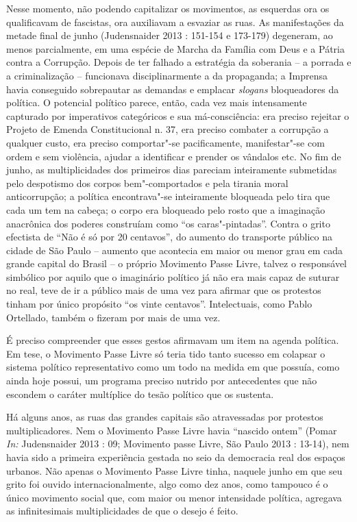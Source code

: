Nesse momento, não podendo capitalizar os movimentos, as esquerdas ora
os qualificavam de fascistas, ora auxiliavam a esvaziar as ruas. As
manifestações da metade final de junho (Judensnaider 2013 : 151-154 e
173-179) degeneram, ao menos parcialmente, em uma espécie de Marcha da
Família com Deus e a Pátria contra a Corrupção. Depois de ter falhado a
estratégia da soberania -- a porrada e a criminalização -- funcionava
disciplinarmente a da propaganda; a Imprensa havia conseguido
sobrepautar as demandas e emplacar \emph{slogans }bloqueadores da
política. O potencial político parece, então, cada vez mais intensamente
capturado por imperativos categóricos e sua má-consciência: era preciso
rejeitar o Projeto de Emenda Constitucional n. 37, era preciso combater
a corrupção a qualquer custo, era preciso comportar"-se pacificamente,
manifestar"-se com ordem e sem violência, ajudar a identificar e prender
os vândalos etc. No fim de junho, as multiplicidades dos primeiros dias
pareciam inteiramente submetidas pelo despotismo dos corpos
bem"-comportados e pela tirania moral anticorrupção; a política
encontrava"-se inteiramente bloqueada pelo tira que cada um tem na
cabeça; o corpo era bloqueado pelo rosto que a imaginação anacrônica dos
poderes construíam como ``os caras"-pintadas''. Contra o grito efectista
de ``Não é só por 20 centavos'', do aumento do transporte público na
cidade de São Paulo -- aumento que acontecia em maior ou menor grau em
cada grande capital do Brasil -- o próprio Movimento Passe Livre, talvez
o responsável simbólico por aquilo que o imaginário político já não era
mais capaz de suturar no real, teve de ir a público mais de uma vez para
afirmar que os protestos tinham por único propósito ``os vinte
centavos''. Intelectuais, como Pablo Ortellado, também o fizeram por
mais de uma vez.

É preciso compreender que esses gestos afirmavam um item na agenda
política. Em tese, o Movimento Passe Livre só teria tido tanto sucesso
em colapsar o sistema político representativo como um todo na medida em
que possuía, como ainda hoje possui, um programa preciso nutrido por
antecedentes que não escondem o caráter multíplice do tesão político que
os sustenta.

Há alguns anos, as ruas das grandes capitais são atravessadas por
protestos multiplicadores. Nem o Movimento Passe Livre havia ``nascido
ontem'' (Pomar \emph{In: }Judensnaider 2013 : 09; Movimento passe Livre,
São Paulo 2013 : 13-14), nem havia sido a primeira experiência gestada
no seio da democracia real dos espaços urbanos. Não apenas o Movimento
Passe Livre tinha, naquele junho em que seu grito foi ouvido
internacionalmente, algo como dez anos, como tampouco é o único
movimento social que, com maior ou menor intensidade política, agregava
as infinitesimais multiplicidades de que o desejo é feito.

